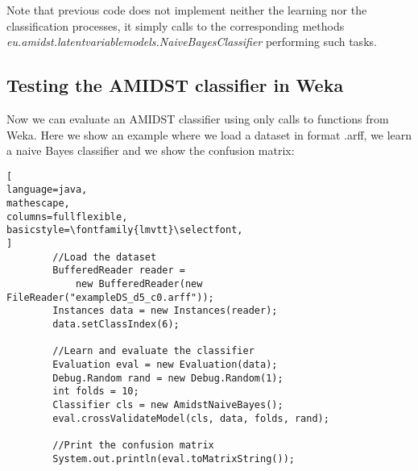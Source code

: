 \documentclass[10pt,a4paper]{article}
\begin{document}
Note that previous code does not implement neither the learning \linebreak nor the classification processes, it simply calls to the corresponding methods \textit{eu.amidst.latentvariablemodels.NaiveBayesClassifier} performing such tasks. 


\subsection{Testing the AMIDST classifier in Weka}

Now we can evaluate an AMIDST classifier using only calls to functions from Weka. Here we show an example where we load a dataset in format .arff, we learn a naive Bayes classifier and we show the confusion matrix:

\begin{lstlisting}[
language=java,
mathescape,
columns=fullflexible,
basicstyle=\fontfamily{lmvtt}\selectfont,
]
        //Load the dataset
        BufferedReader reader = 
	        new BufferedReader(new FileReader("exampleDS_d5_c0.arff"));
        Instances data = new Instances(reader);
        data.setClassIndex(6);
        
        //Learn and evaluate the classifier
        Evaluation eval = new Evaluation(data);
        Debug.Random rand = new Debug.Random(1); 
        int folds = 10;
        Classifier cls = new AmidstNaiveBayes();
        eval.crossValidateModel(cls, data, folds, rand);
        
        //Print the confusion matrix
        System.out.println(eval.toMatrixString());
\end{lstlisting}
\end{document}
